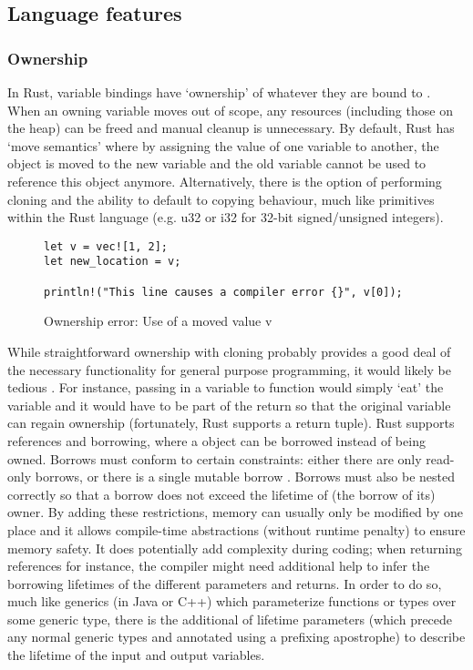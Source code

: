 \subsection{Language features}

\subsubsection{Ownership}

In Rust, variable bindings have `ownership' of whatever they are bound to \cite{docowner15}\cite{rustbook15}. When an owning variable moves out of scope, any resources (including those on the heap) can be freed and manual cleanup is unnecessary. By default, Rust has `move semantics' where by assigning the value of one variable to another, the object is moved to the new variable and the old variable cannot be used to reference this object anymore. Alternatively, there is the option of performing cloning and the ability to default to copying behaviour, much like primitives within the Rust language (e.g. u32 or i32 for 32-bit signed/unsigned integers).

\begin{figure}[H]
\centering
\begin{verbatim}
let v = vec![1, 2];
let new_location = v;

println!("This line causes a compiler error {}", v[0]);
\end{verbatim}
\caption{Ownership error: Use of a moved value v}
\end{figure}

While straightforward ownership with cloning probably provides a good deal of the necessary functionality for general purpose programming, it would likely be tedious \cite{docowner15}. For instance, passing in a variable to function would simply `eat' the variable and it would have to be part of the return so that the original variable can regain ownership (fortunately, Rust supports a return tuple). Rust supports references and borrowing, where a object can be borrowed instead of being owned. Borrows must conform to certain constraints: either there are only read-only borrows, or there is a single mutable borrow \cite{docborrow15}. Borrows must also be nested correctly so that a borrow does not exceed the lifetime of (the borrow of its) owner. By adding these restrictions, memory can usually only be modified by one place and it allows compile-time abstractions (without runtime penalty) to ensure memory safety. It does potentially add complexity during coding; when returning references for instance, the compiler might need additional help to infer the borrowing lifetimes of the different parameters and returns. In order to do so, much like generics (in Java or C++) which parameterize functions or types over some generic type, there is the additional of lifetime parameters (which precede any normal generic types and annotated using a prefixing apostrophe) to describe the lifetime of the input and output variables.

